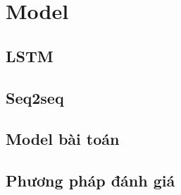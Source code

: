 %
\chapter{Model}
\label{sec:model}

\section{LSTM}
\label{sec:model:LSTM}


\section{Seq2seq}
\label{sec:model:seq2seq}



\section{Model bài toán}
\label{sec:model:model}


\section{Phương pháp đánh giá}
\label{sec:model:evalution}

